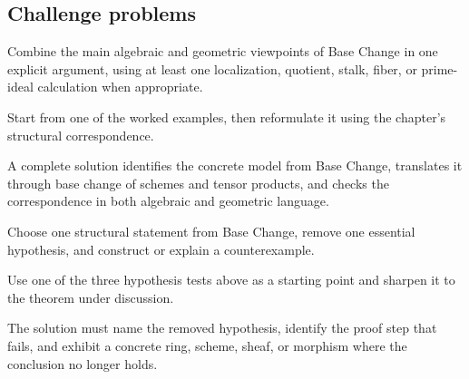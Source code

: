 \subsection*{Challenge problems}

\begin{exercise}\label{exr:vi24-expand-15}
Combine the main algebraic and geometric viewpoints of Base Change in one explicit argument, using at least one localization, quotient, stalk, fiber, or prime-ideal calculation when appropriate.
\end{exercise}
\begin{hint}
Start from one of the worked examples, then reformulate it using the chapter's structural correspondence.
\end{hint}
\begin{solution}
A complete solution identifies the concrete model from Base Change, translates it through base change of schemes and tensor products, and checks the correspondence in both algebraic and geometric language.
\end{solution}

\begin{exercise}\label{exr:vi24-expand-16}
Choose one structural statement from Base Change, remove one essential hypothesis, and construct or explain a counterexample.
\end{exercise}
\begin{hint}
Use one of the three hypothesis tests above as a starting point and sharpen it to the theorem under discussion.
\end{hint}
\begin{solution}
The solution must name the removed hypothesis, identify the proof step that fails, and exhibit a concrete ring, scheme, sheaf, or morphism where the conclusion no longer holds.
\end{solution}

